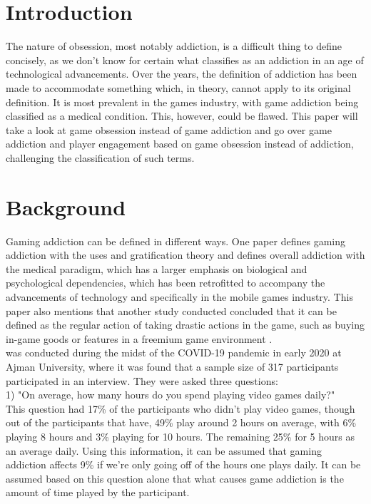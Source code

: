 \documentclass[conference]{IEEEtran}
\begin{document}
\section{Introduction}
The nature of obsession, most notably addiction, is a difficult thing to define concisely, as we don't know for certain what classifies as an addiction in an age of technological advancements. Over the years, the definition of addiction has been made to accommodate something which, in theory, cannot apply to its original definition. It is most prevalent in the games industry, with game addiction being classified as a medical condition. This, however, could be flawed. This paper will take a look at game obsession instead of game addiction and go over game addiction and player engagement based on game obsession instead of addiction, challenging the classification of such terms.\\
\section{Background}
Gaming addiction can be defined in different ways. One paper \cite{yasir2021} defines gaming addiction with the uses and gratification theory and defines overall addiction with the medical paradigm, which has a larger emphasis on biological and psychological dependencies, which has been retrofitted to accompany the advancements of technology and specifically in the mobile games industry. This paper also mentions that another study conducted concluded that it can be defined as the regular action of taking drastic actions in the game, such as buying in-game goods or features in a freemium game environment \cite{XWang2021}. \\

\cite{Naaj2021} was conducted during the midst of the COVID-19 pandemic in early 2020 at Ajman University, where it was found that a sample size of 317 participants participated in an interview. They were asked three questions: \\

1) "On average, how many hours do you spend playing video games daily?"\\
This question had 17\%  of the participants who didn't play video games, though out of the participants that have, 49\% play around 2 hours on average, with 6\%  playing 8 hours and 3\% playing for 10 hours. The remaining 25\%  for 5 hours as an average daily. Using this information, it can be assumed that gaming addiction affects 9\% if we're only going off of the hours one plays daily. It can be assumed based on this question alone that what causes game addiction is the amount of time played by the participant.\\
\end{document}
